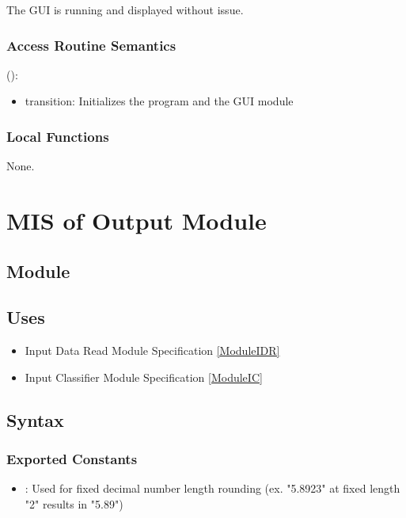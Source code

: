 \documentclass[12pt, titlepage]{article}
\begin{document}
The GUI is running and displayed without issue.

\subsubsection{Access Routine Semantics}

\noindent {}():
\begin{itemize}
  \item transition: Initializes the program and the GUI module 
\end{itemize}

\subsubsection{Local Functions}

None.

\section{MIS of Output Module} \label{ModuleO} 


\subsection{Module}


\subsection{Uses}

\begin{itemize}
  \item Input Data Read Module Specification \ref{ModuleIDR}
  \item Input Classifier Module Specification \ref{ModuleIC}
\end{itemize}

\subsection{Syntax}

\subsubsection{Exported Constants}

\begin{itemize}
  \item {}: Used for fixed decimal number length rounding (ex. "5.8923" at fixed length "2" results in "5.89")
\end{itemize}
\end{document}
